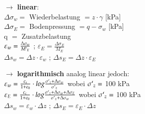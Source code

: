 	
	\begin{minipage}{0.5\linewidth}
		$\rightarrow$ \textbf{linear}: \\
		$\Delta \sigma_w=$ Wiederbelastung $=z \cdot \gamma$ [kPa] \\
		$\Delta \sigma_E=$ Bodenpressung $=q - \sigma_w$ [kPa] \\
		q $=$ Zusatzbelastung \\
		$\varepsilon_w = \frac{\Delta \sigma_w}{M`_E}$ ; $\varepsilon_E = \frac{\Delta \sigma_E}{M_E}$ \\
		$\Delta s_w = \Delta z \cdot\varepsilon_w$ ; $\Delta s_E = \Delta z \cdot\varepsilon_E$\\
	\end{minipage}	
	\begin{minipage}{0.5\linewidth}
		$\rightarrow$ \textbf{logarithmisch} analog linear jedoch: \\
		$\varepsilon_w = \frac{c_s}{1 + e_0} \cdot log \frac{\sigma`_z + \Delta \sigma_w}{\sigma`_z}$ wobei $\sigma`_z =$ 100 kPa \\
		$\varepsilon_E = \frac{c_c}{1 + e_0} \cdot log \frac{\sigma`_z + \Delta \sigma_w + \Delta \sigma_E}{\sigma`_z + \Delta \sigma_w}$ wobei $\sigma`_z =$ 100 kPa \\
		$\Delta s_w= \varepsilon_w \cdot \Delta z$ ; $\Delta s_E= \varepsilon_E \cdot \Delta z$ \\
		\vspace{\baselineskip}
	\end{minipage}
	
%	
%	
	
	
	


